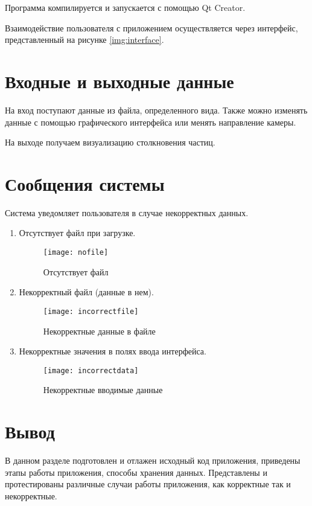 Программа компилируется и запускается с помощью Qt Creator. 

Взаимодействие пользователя с приложением осуществляется через интерфейс, представленный на рисунке \ref{img:interface}. 

\section{\textbf{Входные и выходные данные }}

На вход поступают данные из файла, определенного вида. Также можно изменять данные с помощью графического интерфейса или менять направление камеры. 

На выходе получаем визуализацию столкновения частиц. 


\section{\textbf{Сообщения  системы }}

Система уведомляет пользователя в случае некорректных данных. 

\begin{enumerate}
	\item Отсутствует файл при загрузке. 
	\begin{figure}[H]
		\centering
		\texttt{[image: nofile]}
		\caption{Отсутствует файл}
		\label{img:nofile}
	\end{figure}
	\item Некорректный файл (данные в нем). 
	\begin{figure}[H]
		\centering
		\texttt{[image: incorrectfile]}
		\caption{Некорректные данные в файле}
		\label{img:incorrectfile}
	\end{figure}
	\item Некорректные значения в полях ввода интерфейса. 
	\begin{figure}[H]
		\centering
		\texttt{[image: incorrectdata]}
		\caption{Некорректные вводимые данные}
		\label{img:incorrectdata}
	\end{figure}
\end{enumerate}

\section{\textbf{Вывод}}

В данном разделе подготовлен и отлажен исходный код приложения, приведены этапы работы приложения, способы хранения данных. Представлены и протестированы различные случаи работы приложения, как корректные так и некорректные. 
